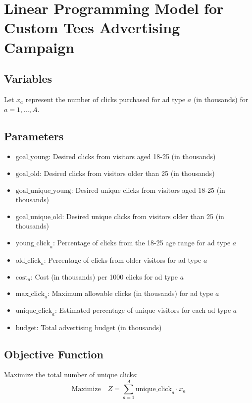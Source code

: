 \documentclass{article}
\begin{document}
\section*{Linear Programming Model for Custom Tees Advertising Campaign}

\subsection*{Variables}
Let \( x_a \) represent the number of clicks purchased for ad type \( a \) (in thousands) for \( a = 1, \ldots, A \).

\subsection*{Parameters}
\begin{itemize}
    \item \( \text{goal\_young} \): Desired clicks from visitors aged 18-25 (in thousands)
    \item \( \text{goal\_old} \): Desired clicks from visitors older than 25 (in thousands)
    \item \( \text{goal\_unique\_young} \): Desired unique clicks from visitors aged 18-25 (in thousands)
    \item \( \text{goal\_unique\_old} \): Desired unique clicks from visitors older than 25 (in thousands)
    \item \( \text{young\_click}_{a} \): Percentage of clicks from the 18-25 age range for ad type \( a \)
    \item \( \text{old\_click}_{a} \): Percentage of clicks from older visitors for ad type \( a \)
    \item \( \text{cost}_{a} \): Cost (in thousands) per 1000 clicks for ad type \( a \)
    \item \( \text{max\_click}_{a} \): Maximum allowable clicks (in thousands) for ad type \( a \)
    \item \( \text{unique\_click}_{a} \): Estimated percentage of unique visitors for each ad type \( a \)
    \item \( \text{budget} \): Total advertising budget (in thousands)
\end{itemize}

\subsection*{Objective Function}
Maximize the total number of unique clicks:
\[
\text{Maximize} \quad Z = \sum_{a=1}^{A} \text{unique\_click}_{a} \cdot x_a
\]
\end{document}
